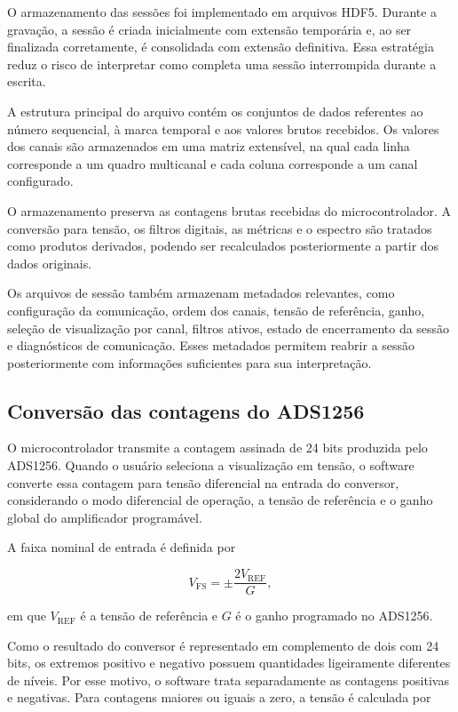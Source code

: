 \documentclass[a4paper,12pt]{fcte}
\begin{document}
O armazenamento das sessões foi implementado em arquivos HDF5. Durante a gravação, a sessão é criada inicialmente com extensão temporária e, ao ser finalizada corretamente, é consolidada com extensão definitiva. Essa estratégia reduz o risco de interpretar como completa uma sessão interrompida durante a escrita.

A estrutura principal do arquivo contém os conjuntos de dados referentes ao número sequencial, à marca temporal e aos valores brutos recebidos. Os valores dos canais são armazenados em uma matriz extensível, na qual cada linha corresponde a um quadro multicanal e cada coluna corresponde a um canal configurado.

O armazenamento preserva as contagens brutas recebidas do microcontrolador. A conversão para tensão, os filtros digitais, as métricas e o espectro são tratados como produtos derivados, podendo ser recalculados posteriormente a partir dos dados originais.

Os arquivos de sessão também armazenam metadados relevantes, como configuração da comunicação, ordem dos canais, tensão de referência, ganho, seleção de visualização por canal, filtros ativos, estado de encerramento da sessão e diagnósticos de comunicação. Esses metadados permitem reabrir a sessão posteriormente com informações suficientes para sua interpretação.

\subsection{Conversão das contagens do ADS1256}
\label{subsec:conversao_ads_software}

O microcontrolador transmite a contagem assinada de 24 bits produzida pelo ADS1256. Quando o usuário seleciona a visualização em tensão, o software converte essa contagem para tensão diferencial na entrada do conversor, considerando o modo diferencial de operação, a tensão de referência e o ganho global do amplificador programável.

A faixa nominal de entrada é definida por

\begin{equation}
    V_{\mathrm{FS}} =
    \pm \frac{2V_{\mathrm{REF}}}{G},
    \label{eq:vfs_ads1256_software}
\end{equation}

\noindent
em que $V_{\mathrm{REF}}$ é a tensão de referência e $G$ é o ganho programado no ADS1256.

Como o resultado do conversor é representado em complemento de dois com 24 bits, os extremos positivo e negativo possuem quantidades ligeiramente diferentes de níveis. Por esse motivo, o software trata separadamente as contagens positivas e negativas. Para contagens maiores ou iguais a zero, a tensão é calculada por
\end{document}
